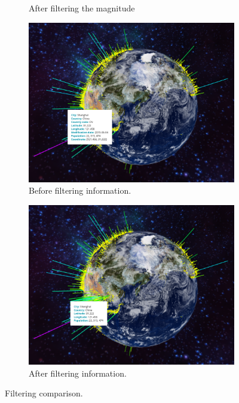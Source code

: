 \begin{figure}[H]
\begin{subfigure}[b]{\figurewidth}
		\caption{After filtering the magnitude}
		\label{fig:after_filtering_magnitude}
	\end{subfigure}
	\begin{subfigure}[b]{\figurewidth}
		\includegraphics[width=\textwidth]{images/implementation/filtering/information_before}
		\caption{Before filtering information.}
		\label{fig:before_filtering_information}
	\end{subfigure}
	\begin{subfigure}[b]{\figurewidth}
		\includegraphics[width=\textwidth]{images/implementation/filtering/information_after}
		\caption{After filtering information.}
		\label{fig:after_filtering_information}
	\end{subfigure}
	\caption[Filtering comparison]{Filtering comparison.}
	\label{fig:filtering_comparison}
\end{figure}
